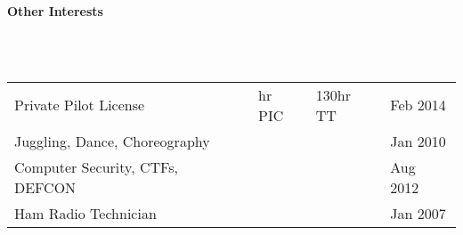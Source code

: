 \documentclass[a4paper,11pt]{article}
\newcommand{\lsep}{-0.2cm}
\newcommand{\resheading}[1]{{\small \colorbox{mygrey}{\begin{minipage}{0.975\textwidth}{\textbf{#1 \vphantom{p\^{E}}}}\end{minipage}}}}
\begin{document}
\resheading{\textbf{Other Interests} }\\[\lsep]
\\[0.2cm]
\indent \begin{tabular}{   l  l  l  l } 
\indent Private Pilot License & \indent 40 hr PIC & \indent 130hr TT  \indent & \indent Feb 2014\\
\indent Juggling, Dance, Choreography \indent \indent \indent & \indent    & \indent  & \indent Jan 2010 \\
\indent Computer Security, CTFs, DEFCON & \indent  & \indent  & \indent Aug 2012\\
\indent Ham Radio Technician & \indent  & \indent  & \indent Jan 2007\\
\end{tabular}



\end{document}
